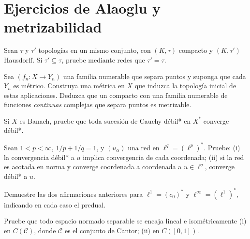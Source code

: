 \section{Ejercicios de Alaoglu y metrizabilidad}
\begin{ejercicio}\label{ej:v3-l16-1}
Sean $\tau$ y $\tau'$ topologías en un mismo conjunto, con $(K,\tau)$ compacto y $(K,\tau')$ Hausdorff. Si $\tau'\subseteq\tau$, pruebe mediante redes que $\tau'=\tau$.
\end{ejercicio}


\begin{ejercicio}\label{ej:v3-l16-2}
Sea $(f_n:X\to Y_n)$ una familia numerable que separa puntos y suponga que cada $Y_n$ es métrico. Construya una métrica en $X$ que induzca la topología inicial de estas aplicaciones. Deduzca que un compacto con una familia numerable de funciones \emph{continuas} complejas que separa puntos es metrizable.
\end{ejercicio}


\begin{ejercicio}\label{ej:v3-l16-3}
Si $X$ es Banach, pruebe que toda sucesión de Cauchy débil* en $X^*$ converge débil*.
\end{ejercicio}


\begin{ejercicio}\label{ej:v3-l16-4}
Sean $1<p<\infty$, $1/p+1/q=1$, y $(u_\alpha)$ una red en $\ell^q=(\ell^p)^*$. Pruebe: (i) la convergencia débil* a $u$ implica convergencia de cada coordenada; (ii) si la red es acotada en norma y converge coordenada a coordenada a $u\in\ell^q$, converge débil* a $u$.
\end{ejercicio}


\begin{ejercicio}\label{ej:v3-l16-5}
Demuestre las dos afirmaciones anteriores para $\ell^1=(c_0)^*$ y $\ell^\infty=(\ell^1)^*$, indicando en cada caso el predual.
\end{ejercicio}


\begin{ejercicio}\label{ej:v3-l16-6}
Pruebe que todo espacio normado separable se encaja lineal e isométricamente (i) en $C(\mathcal C)$, donde $\mathcal C$ es el conjunto de Cantor; (ii) en $C([0,1])$.
\end{ejercicio}


